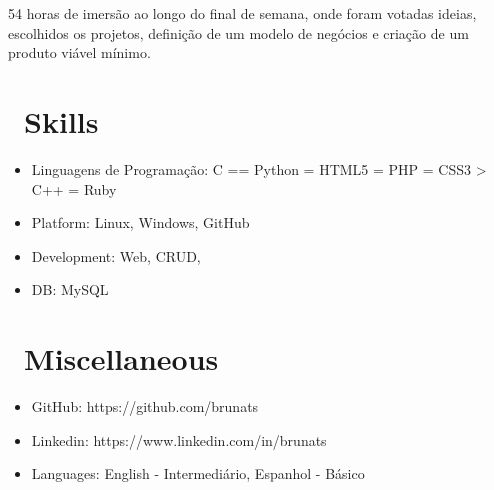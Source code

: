 \documentclass{resume}
\begin{document}
54 horas de imersão ao longo do final de semana, onde foram votadas ideias, escolhidos os projetos, definição de um modelo de negócios e criação de um produto viável mínimo.

\section{\faCogs\ Skills}
\begin{itemize}[parsep=0.5ex]
  \item Linguagens de Programação: C == Python = HTML5 = PHP = CSS3 > C++ = Ruby
  \item Platform: Linux, Windows, GitHub
  \item Development: Web, CRUD,
  \item DB: MySQL
\end{itemize}

\section{\faInfo\ Miscellaneous}
\begin{itemize}[parsep=0.5ex]
  \item GitHub: https://github.com/brunats
  \item Linkedin: https://www.linkedin.com/in/brunats
  \item Languages: English - Intermediário, Espanhol - Básico
\end{itemize}

%
%
\end{document}
